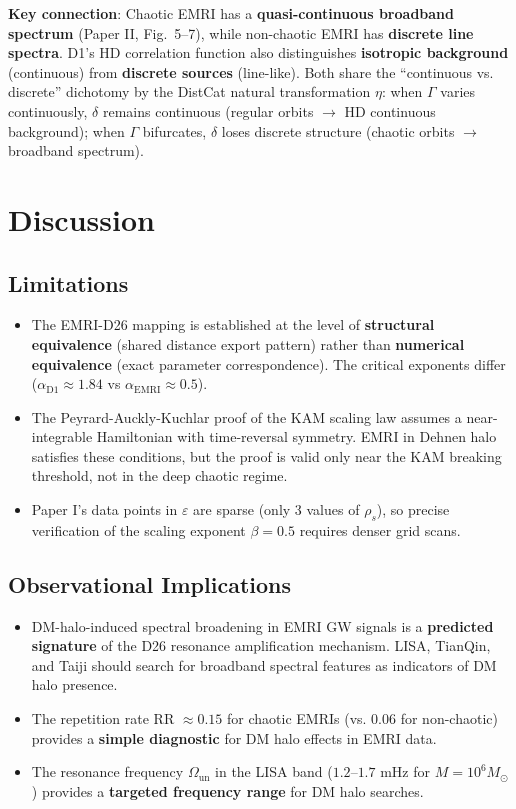 \documentclass[12pt]{article}
\begin{document}
\textbf{Key connection}: Chaotic EMRI has a \textbf{quasi-continuous broadband spectrum} (Paper II, Fig.~5--7), while non-chaotic EMRI has \textbf{discrete line spectra}. D1's HD correlation function also distinguishes \textbf{isotropic background} (continuous) from \textbf{discrete sources} (line-like). Both share the ``continuous vs. discrete'' dichotomy by the DistCat natural transformation $\eta$: when $\Gamma$ varies continuously, $\delta$ remains continuous (regular orbits $\to$ HD continuous background); when $\Gamma$ bifurcates, $\delta$ loses discrete structure (chaotic orbits $\to$ broadband spectrum).

\section{Discussion}

\subsection{Limitations}

\begin{itemize}
\item The EMRI-D26 mapping is established at the level of \textbf{structural equivalence} (shared distance export pattern) rather than \textbf{numerical equivalence} (exact parameter correspondence). The critical exponents differ ($\alpha_{\text{D1}} \approx 1.84$ vs $\alpha_{\text{EMRI}} \approx 0.5$).
\item The Peyrard-Auckly-Kuchlar proof of the KAM scaling law assumes a near-integrable Hamiltonian with time-reversal symmetry. EMRI in Dehnen halo satisfies these conditions, but the proof is valid only near the KAM breaking threshold, not in the deep chaotic regime.
\item Paper I's data points in $\varepsilon$ are sparse (only 3 values of $\rho_s$), so precise verification of the scaling exponent $\beta = 0.5$ requires denser grid scans.
\end{itemize}

\subsection{Observational Implications}

\begin{itemize}
\item DM-halo-induced spectral broadening in EMRI GW signals is a \textbf{predicted signature} of the D26 resonance amplification mechanism. LISA, TianQin, and Taiji should search for broadband spectral features as indicators of DM halo presence.
\item The repetition rate RR $\approx 0.15$ for chaotic EMRIs (vs. $0.06$ for non-chaotic) provides a \textbf{simple diagnostic} for DM halo effects in EMRI data.
\item The resonance frequency $\Omega_{\text{un}}$ in the LISA band ($1.2$--$1.7$ mHz for $M = 10^6 M_\odot$) provides a \textbf{targeted frequency range} for DM halo searches.
\end{itemize}
\end{document}
